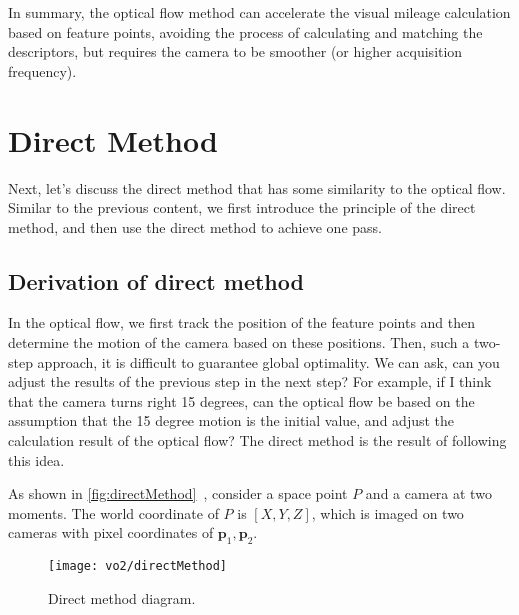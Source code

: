 In summary, the optical flow method can accelerate the visual mileage calculation based on feature points, avoiding the process of calculating and matching the descriptors, but requires the camera to be smoother (or higher acquisition frequency).

\section{Direct Method}
Next, let's discuss the direct method that has some similarity to the optical flow. Similar to the previous content, we first introduce the principle of the direct method, and then use the direct method to achieve one pass.

\subsection{Derivation of direct method}
In the optical flow, we first track the position of the feature points and then determine the motion of the camera based on these positions. Then, such a two-step approach, it is difficult to guarantee global optimality. We can ask, can you adjust the results of the previous step in the next step? For example, if I think that the camera turns right 15 degrees, can the optical flow be based on the assumption that the 15 degree motion is the initial value, and adjust the calculation result of the optical flow? The direct method is the result of following this idea.

As shown in \autoref{fig:directMethod}~, consider a space point $P$ and a camera at two moments. The world coordinate of $P$ is $[X,Y,Z]$, which is imaged on two cameras with pixel coordinates of $\bm{p}_1, \bm{p}_2$.

\begin{figure}[!htp]
\centering
\texttt{[image: vo2/directMethod]}
\caption{Direct method diagram. }
\label{fig:directMethod}
\end{figure}

